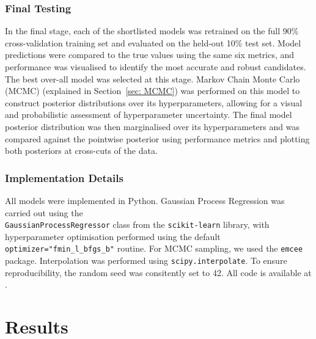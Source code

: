 \documentclass{ucdgradtaughtthesis}
\begin{document}
 \subsection{Final Testing}
In the final stage, each of the shortlisted models was retrained on the full 90\% cross-validation training set and evaluated on the held-out 10\% test set. Model predictions were compared to the true values using the same six metrics, and performance was visualised to identify the most accurate and robust candidates.
The best over-all model was selected at this stage. Markov Chain Monte Carlo (MCMC) (explained in Section~\ref{sec: MCMC}) was performed on this model
to construct posterior distributions over its hyperparameters, allowing for a visual and probabilistic assessment of hyperparameter uncertainty. 
The final model posterior distribution was then marginalised over its hyperparameters and was
compared against the pointwise posterior using performance metrics and plotting both posteriors at cross-cuts of the data.
 

\subsection{Implementation Details}
\label{subsubsec:implementdetails}
All models were implemented in Python. Gaussian Process Regression was carried out using the \\
\texttt{GaussianProcessRegressor} class from the \texttt{scikit-learn} library, with hyperparameter optimisation performed using the 
default \texttt{optimizer="fmin\_l\_bfgs\_b"} routine. 
For MCMC sampling, we used the \texttt{emcee} package. Interpolation was performed using \texttt{scipy.interpolate}. 
To ensure reproducibility, the random seed was consitently set to 42. All code is available at \cite{githubrepo}.
%
%
%
\chapter{Results}
\end{document}
